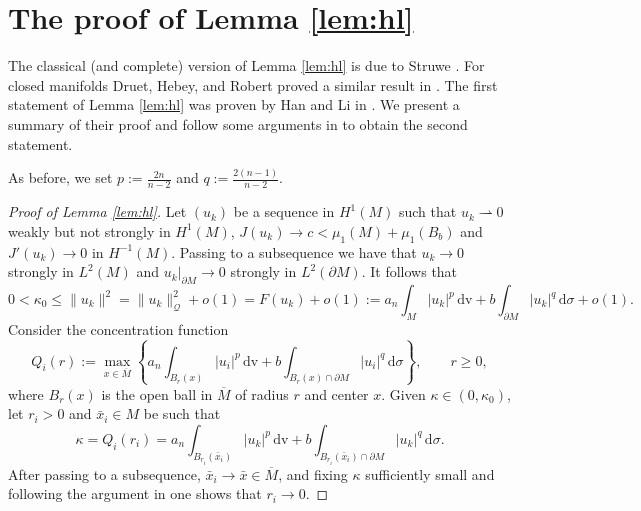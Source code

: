 \documentclass[reqno,11pt,oneside]{amsart}
\numberwithin{equation}{section}
\def\rh{\rightharpoonup}
\def\im{\int_{M}}
\def\idm{\int_{\partial M}}
\def\d{\,\mathrm{d}}
\def\dv{\,\mathrm{dv}}
\begin{document}
\appendix

\section{The proof of Lemma \ref{lem:hl}}
\label{app:lemma hl}

The classical (and complete) version of Lemma \ref{lem:hl} is due to Struwe \cite{s}. For closed manifolds Druet, Hebey, and Robert proved a similar result in \cite[Lemma 3.2]{dhr}. The first statement of Lemma \ref{lem:hl} was proven by Han and Li in \cite[Lemma A.2]{hl}. We present a summary of their proof and follow some arguments in \cite{dhr} to obtain the second statement.

As before, we set $p:=\frac{2n}{n-2}$ and $q:=\frac{2(n-1)}{n-2}$.

\begin{proof}[Proof of Lemma \ref{lem:hl}] 
Let $(u_k)$ be a sequence in $H^1(M)$ such that $u_k\rh 0$ weakly but not strongly in $H^1(M)$, $J(u_k)\to c<\mu_1(M)+\mu_1(B_b)$ and $J'(u_k)\to 0$ in $H^{-1}(M)$. Passing to a subsequence we have that $u_k\to0$ strongly in $L^2(M)$ and $u_k|_{\partial M}\to0$ strongly in $L^2(\partial M)$. It follows that
$$0<\kappa_0\leq\|u_k\|^2=\|u_k\|_\mathscr{Q}^2+o(1)=F(u_k)+o(1):=a_n\im |u_k|^p \dv + b\idm|u_k|^q\d\sigma+o(1).$$
Consider the concentration function
$$Q_i(r):=\max_{x\in \overline{M}}\left\{a_n\int_{B_r(x)} |u_i|^p \dv + b\int_{B_r(x)\cap\partial M}|u_i|^q\d\sigma\right\},\qquad r\geq0,$$
where $B_r(x)$ is the open ball in $\overline{M}$ of radius $r$ and center $x$. Given $\kappa\in(0,\kappa_0)$, let $r_i>0$ and $\bar{x}_i\in M$ be such that
\begin{equation} \label{eq:kappa}
\kappa=Q_i(r_i)=a_n\int_{B_{r_i}(\bar{x}_i)} |u_k|^p \dv + b\int_{B_{r_i}(\bar{x}_i)\cap\partial M}|u_k|^q\d\sigma.
\end{equation}
After passing to a subsequence, $\bar{x}_i\to\bar{x}\in \overline{M}$, and fixing $\kappa$ sufficiently small and following the argument in \cite[(A.12) and (A.13)]{hl} one shows that $r_i\to 0$.


\end{proof}
\end{document}
